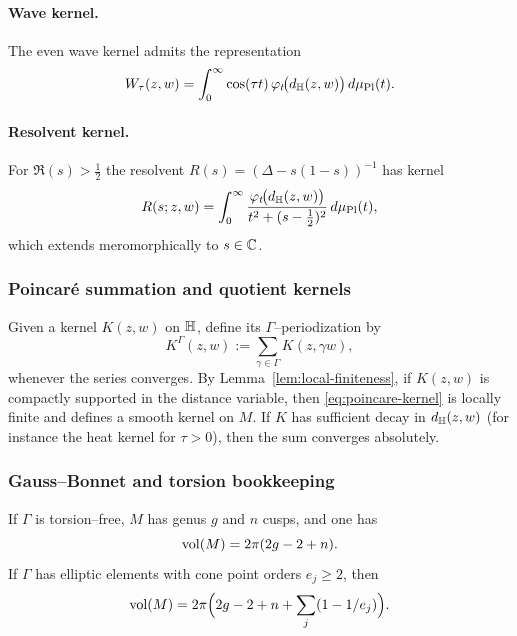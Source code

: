 \paragraph{Wave kernel.}
The even wave kernel admits the representation
\begin{equation}\label{eq:wave-kernel}
W_{\tau}(z,w)
=
\int_{0}^{\infty}
\cos(\tau t)\,
\varphi_{t}\!\bigl(d_{\mathbb{H}}(z,w)\bigr)\,
d\mu_{\mathrm{Pl}}(t).
\end{equation}

\paragraph{Resolvent kernel.}
For $\Re(s)>\frac12$ the resolvent $R(s)=(\Delta-s(1-s))^{-1}$ has kernel
\begin{equation}\label{eq:resolvent-kernel}
R(s;z,w)
=
\int_{0}^{\infty}
\frac{\varphi_{t}\!\bigl(d_{\mathbb{H}}(z,w)\bigr)}{t^{2}+(s-\frac12)^{2}}\,
d\mu_{\mathrm{Pl}}(t),
\end{equation}
which extends meromorphically to $s\in\mathbb{C}$.

\subsubsection{Poincar\'e summation and quotient kernels}

Given a kernel $K(z,w)$ on $\mathbb{H}$, define its $\Gamma$--periodization by
\begin{equation}\label{eq:poincare-kernel}
K^{\Gamma}(z,w)
:=
\sum_{\gamma\in\Gamma}K(z,\gamma w),
\end{equation}
whenever the series converges. By Lemma~\ref{lem:local-finiteness}, if $K(z,w)$ is compactly supported
in the distance variable, then \eqref{eq:poincare-kernel} is locally finite and defines a smooth kernel on $M$.
If $K$ has sufficient decay in $d_{\mathbb{H}}(z,w)$ (for instance the heat kernel for $\tau>0$),
then the sum converges absolutely.

\subsubsection{Gauss--Bonnet and torsion bookkeeping}

If $\Gamma$ is torsion--free, $M$ has genus $g$ and $n$ cusps, and one has
\begin{equation}\label{eq:gauss-bonnet}
\mathop{\mathrm{vol}}\nolimits(M)=2\pi(2g-2+n).
\end{equation}
If $\Gamma$ has elliptic elements with cone point orders $e_{j}\ge 2$, then
\begin{equation}\label{eq:gauss-bonnet-orb}
\mathop{\mathrm{vol}}\nolimits(M)
=
2\pi\Bigl(2g-2+n+\sum_{j}(1-1/e_{j})\Bigr).
\end{equation}

